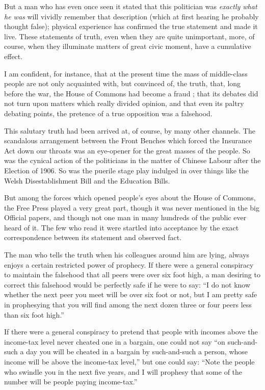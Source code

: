 \documentclass{book}
\begin{document}
But a man who has even once seen it stated that this politician was \emph{exactly what he was} will vividly remember that description (which at first hearing he probably thought false); physical experience has confirmed the true statement and made it live. These statements of truth, even when they are quite unimportant, more, of course, when they illuminate matters of great civic moment, have a cumulative effect.

I am confident, for instance, that at the present time the mass of middle-class people are not only acquainted with, but convinced of, the truth, that, long before the war, the House of Commons had become a fraud ; that its debates did not turn upon matters which really divided opinion, and that even its paltry debating points, the pretence of a true opposition was a falsehood.

This salutary truth had been arrived at, of course, by many other channels. The scandalous arrangement between the Front Benches which forced the Insurance Act down our throats was an eye-opener for the great masses of the people. So was the cynical action of the politicians in the matter of Chinese Labour after the Election of 1906. So was the puerile stage play indulged in over things like the Welsh Disestablishment Bill and the Education Bills.

But among the forces which opened people’s eyes about the House of Commons, the Free Press played a very great part, though it was never mentioned in the big Official papers, and though not one man in many hundreds of the public ever heard of it. The few who read it were startled into acceptance by the exact correspondence between its statement and observed fact.

The man who tells the truth when his colleagues around him are lying, always enjoys a certain restricted power of prophecy. If there were a general conspiracy to maintain the falsehood that all peers were over six foot high, a man desiring to correct this falsehood would be perfectly safe if he were to say: “I do not know whether the next peer you meet will be over six foot or not, but I am pretty safe in prophesying that you will find among the next dozen three or four peers less than six foot high.”

If there were a general conspiracy to pretend that people with incomes above the income-tax level never cheated one in a bargain, one could not say “on such-and-such a day you will be cheated in a bargain by such-and-such a person, whose income will be above the income-tax level,” but one could say: “Note the people who swindle you in the next five years, and I will prophesy that some of the number will be people paying income-tax.”
\end{document}
